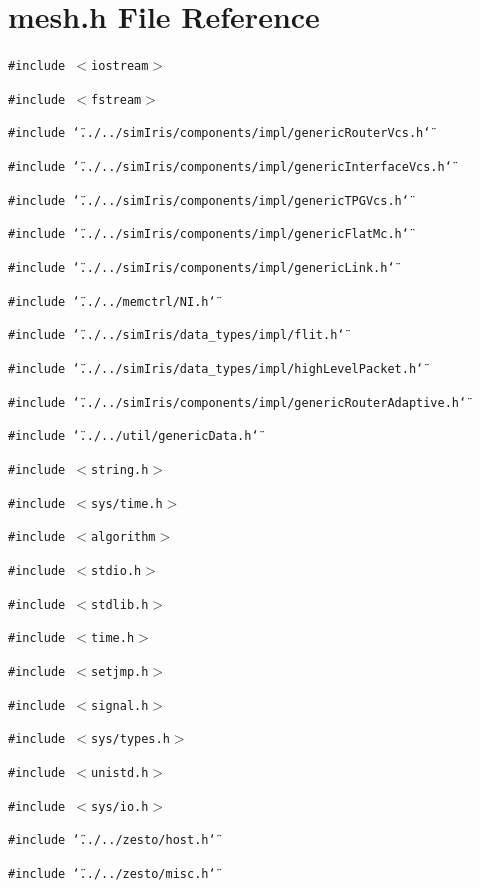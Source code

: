 \section{mesh.h File Reference}
\label{mesh_8h}
{\tt \#include $<$iostream$>$}\par
{\tt \#include $<$fstream$>$}\par
{\tt \#include \char`\"{}../../simIris/components/impl/genericRouterVcs.h\char`\"{}}\par
{\tt \#include \char`\"{}../../simIris/components/impl/genericInterfaceVcs.h\char`\"{}}\par
{\tt \#include \char`\"{}../../simIris/components/impl/genericTPGVcs.h\char`\"{}}\par
{\tt \#include \char`\"{}../../simIris/components/impl/genericFlatMc.h\char`\"{}}\par
{\tt \#include \char`\"{}../../simIris/components/impl/genericLink.h\char`\"{}}\par
{\tt \#include \char`\"{}../../memctrl/NI.h\char`\"{}}\par
{\tt \#include \char`\"{}../../simIris/data\_\-types/impl/flit.h\char`\"{}}\par
{\tt \#include \char`\"{}../../simIris/data\_\-types/impl/highLevelPacket.h\char`\"{}}\par
{\tt \#include \char`\"{}../../simIris/components/impl/genericRouterAdaptive.h\char`\"{}}\par
{\tt \#include \char`\"{}../../util/genericData.h\char`\"{}}\par
{\tt \#include $<$string.h$>$}\par
{\tt \#include $<$sys/time.h$>$}\par
{\tt \#include $<$algorithm$>$}\par
{\tt \#include $<$stdio.h$>$}\par
{\tt \#include $<$stdlib.h$>$}\par
{\tt \#include $<$time.h$>$}\par
{\tt \#include $<$setjmp.h$>$}\par
{\tt \#include $<$signal.h$>$}\par
{\tt \#include $<$sys/types.h$>$}\par
{\tt \#include $<$unistd.h$>$}\par
{\tt \#include $<$sys/io.h$>$}\par
{\tt \#include \char`\"{}../../zesto/host.h\char`\"{}}\par
{\tt \#include \char`\"{}../../zesto/misc.h\char`\"{}}\par
